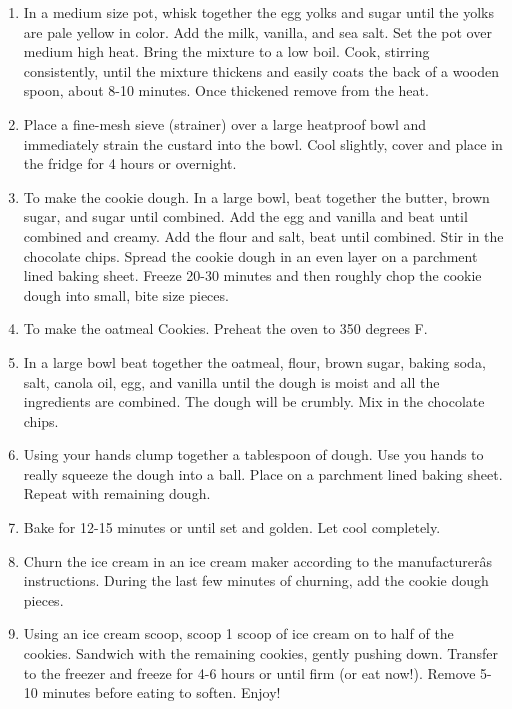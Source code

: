 \documentclass[
  letterpaper,
  DIV=11,
  numbers=noendperiod,
  titlepage=false]{scrreprt}
\providecommand{\tightlist}{%
  \setlength{\itemsep}{0pt}\setlength{\parskip}{0pt}}\usepackage{longtable,booktabs,array}
\begin{document}
\begin{enumerate}
\def\labelenumi{\arabic{enumi}.}
\tightlist
\item
  In a medium size pot, whisk together the egg yolks and sugar until the
  yolks are pale yellow in color. Add the milk, vanilla, and sea salt.
  Set the pot over medium high heat. Bring the mixture to a low boil.
  Cook, stirring consistently, until the mixture thickens and easily
  coats the back of a wooden spoon, about 8-10 minutes. Once thickened
  remove from the heat.
\item
  Place a fine-mesh sieve (strainer) over a large heatproof bowl and
  immediately strain the custard into the bowl. Cool slightly, cover and
  place in the fridge for 4 hours or overnight.
\item
  To make the cookie dough. In a large bowl, beat together the butter,
  brown sugar, and sugar until combined. Add the egg and vanilla and
  beat until combined and creamy. Add the flour and salt, beat until
  combined. Stir in the chocolate chips. Spread the cookie dough in an
  even layer on a parchment lined baking sheet. Freeze 20-30 minutes and
  then roughly chop the cookie dough into small, bite size pieces.
\item
  To make the oatmeal Cookies. Preheat the oven to 350 degrees F.
\item
  In a large bowl beat together the oatmeal, flour, brown sugar, baking
  soda, salt, canola oil, egg, and vanilla until the dough is moist and
  all the ingredients are combined. The dough will be crumbly. Mix in
  the chocolate chips.
\item
  Using your hands clump together a tablespoon of dough. Use you hands
  to really squeeze the dough into a ball. Place on a parchment lined
  baking sheet. Repeat with remaining dough.
\item
  Bake for 12-15 minutes or until set and golden. Let cool completely.
\item
  Churn the ice cream in an ice cream maker according to the
  manufacturerâs instructions. During the last few minutes of churning,
  add the cookie dough pieces.
\item
  Using an ice cream scoop, scoop 1 scoop of ice cream on to half of the
  cookies. Sandwich with the remaining cookies, gently pushing down.
  Transfer to the freezer and freeze for 4-6 hours or until firm (or eat
  now!). Remove 5-10 minutes before eating to soften. Enjoy!
\end{enumerate}
\end{document}
